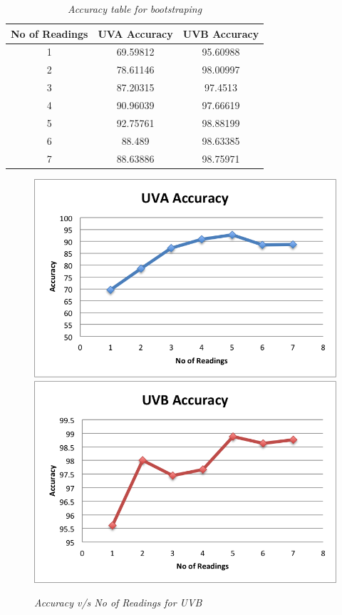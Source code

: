 \documentclass[12pt,fullpage,doublespace]{article}
\begin{document}
\newpage
\begin{table}
\centering
\begin{tabular}{|c|c|c|}
\hline
No of Readings & UVA Accuracy & UVB Accuracy \\
\hline 
1 & 69.59812 & 95.60988\\
\hline
2 & 78.61146 & 98.00997\\
\hline
3 & 87.20315 & 97.4513\\
\hline
4 & 90.96039 & 97.66619\\
\hline
5 & 92.75761 & 98.88199\\
\hline
6 & 88.489 & 98.63385\\
\hline
7 & 88.63886 & 98.75971\\
\hline
\end{tabular}
\caption{\small \sl Accuracy table for bootstraping}\label{seg5accuracy}
\end{table}


\begin{figure}
\begin{center}
\includegraphics[scale=0.5]{segment5uva.png}
\includegraphics[scale=0.5]{segment5uvb.png}
\caption{\small \sl Accuracy v/s No of Readings for UVB}
\label{fig:lessReadings}
\end{center}
\end{figure}
\end{document}
